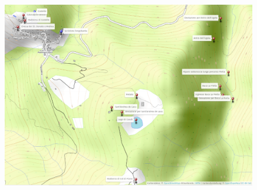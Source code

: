 \documentclass[sustainability,article,submit,pdftex,moreauthors]{Definitions/mdpi}
\begin{document}
\begin{figure}
	\centering
	\includegraphics[width=\linewidth]{figure/mappa}
	\caption[Map with QR-tag positions]{}
	\label{fig:mappa}
\end{figure}
\end{document}
